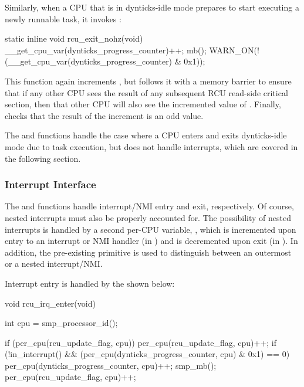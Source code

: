 Similarly, when a CPU that is in dynticks-idle mode prepares to
start executing a newly runnable task, it invokes
:

\begin{VerbatimN}
static inline void rcu_exit_nohz(void)
{
	__get_cpu_var(dynticks_progress_counter)++;
	mb();
	WARN_ON(!(__get_cpu_var(dynticks_progress_counter) &
	          0x1));
}
\end{VerbatimN}

This function again increments ,
but follows it with a memory barrier to ensure that if any other CPU
sees the result of any subsequent RCU read-side critical section,
then that other CPU will also see the incremented value of
.
Finally,  checks that the result of the
increment is an odd value.

The  and 
functions handle the case where a CPU enters and exits dynticks-idle
mode due to task execution, but does not handle interrupts, which are
covered in the following section.

\subsubsection{Interrupt Interface}
\label{sec:formal:Interrupt Interface}

The  and 
functions handle interrupt/NMI entry and exit, respectively.
Of course, nested interrupts must also be properly accounted for.
The possibility of nested interrupts is handled by a second per-CPU
variable, , which is incremented upon
entry to an interrupt or NMI handler (in )
and is decremented upon exit (in ).
In addition, the pre-existing  primitive is
used to distinguish between an outermost or a nested interrupt/NMI\@.

Interrupt entry is handled by the 
shown below:

\begin{fcvlabel}
\begin{VerbatimN}[commandchars=\\\[\]]
void rcu_irq_enter(void)
{
	int cpu = smp_processor_id();	\lnlbl[fetch]

	if (per_cpu(rcu_update_flag, cpu))	\lnlbl[inc:b]
		per_cpu(rcu_update_flag, cpu)++; \lnlbl[inc:e]
	if (!in_interrupt() &&			\lnlbl[chk_lv:b]
	    (per_cpu(dynticks_progress_counter,
	             cpu) & 0x1) == 0) {	\lnlbl[chk_lv:e]
		per_cpu(dynticks_progress_counter, cpu)++; 
		smp_mb();			\lnlbl[mb]
		per_cpu(rcu_update_flag, cpu)++;
	}
}
\end{VerbatimN}
\end{fcvlabel}

